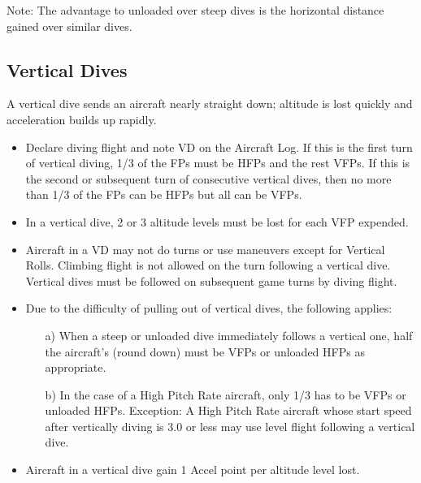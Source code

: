 Note: The advantage to unloaded over steep dives is the horizontal distance gained over similar dives.

\subsection{Vertical Dives}
\label{rule:vertical-dives}

A vertical dive sends an aircraft nearly straight down; altitude is lost quickly and acceleration builds up rapidly.

\begin{itemize}


    \item{} Declare diving flight and note VD on the Aircraft Log. If this is the first turn of vertical diving, 1/3 of the FPs must be HFPs and the rest VFPs. If this is the second or subsequent turn of consecutive vertical dives, then no more than 1/3 of the FPs can be HFPs but all can be VFPs.

    \item{} In a vertical dive, 2 or 3 altitude levels must be lost for each VFP expended.

    \item{} Aircraft in a VD may not do turns or use maneuvers except for Vertical Rolls. Climbing flight is not allowed on the turn following a vertical dive. Vertical dives must be followed on subsequent game turns by diving flight.

    \item{} Due to the difficulty of pulling out of vertical dives, the following applies:
    \begin{enumerate}
        \item[a)] When a steep or unloaded dive immediately follows a vertical one, half the aircraft's  (round down) must be VFPs or unloaded HFPs as appropriate.
        \item[b)]  In the case of a High Pitch Rate aircraft, only 1/3 has to be VFPs or unloaded HFPs. Exception: A High Pitch Rate aircraft whose start speed after vertically diving is 3.0 or less may use level flight following a vertical dive. 
    \end{enumerate}

    \item{} Aircraft in a vertical dive gain 1 Accel point per altitude level lost.

\end{itemize}

